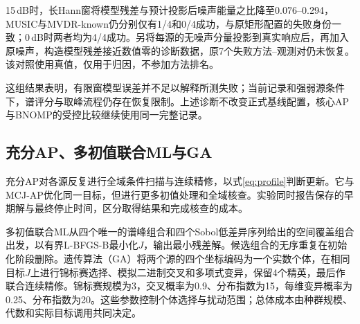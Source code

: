 \documentclass[a4paper]{cas-sc}
\numberwithin{equation}{section}
\numberwithin{figure}{section}
\numberwithin{table}{section}
\begin{document}
15\,dB时，长Hann窗将模型残差与预计投影后噪声能量之比降至0.076--0.294，MUSIC与MVDR-known仍分别仅有1/4和0/4成功，与原矩形配置的失败身份一致；0\,dB时两者均为4/4成功。另将每源的无噪声分量投影到真实响应后，再加入原噪声，构造模型残差接近数值零的诊断数据，原7个失败方法--观测对仍未恢复。该对照使用真值，仅用于归因，不参加方法排名。

这组结果表明，有限窗模型误差并不足以解释所测失败；当前记录和强弱源条件下，谱评分与取峰流程仍存在恢复限制。上述诊断不改变正式基线配置，核心AP与BNOMP的受控比较继续使用同一完整记录。

\subsection{充分AP、多初值联合ML与GA}
充分AP对各源反复进行全域条件扫描与连续精修，以式\eqref{eq:profile}判断更新\cite{ChenHudsonYao2002}。它与MCJ-AP优化同一目标，但进行更多初值处理和全域核查。实验同时报告保存的早期解与最终停止时间，区分取得结果和完成核查的成本。

多初值联合ML从四个唯一的谱峰组合和四个Sobol低差异序列给出的空间覆盖组合出发，以有界L-BFGS-B最小化$J$，输出最小残差解。候选组合的无序重复在初始化阶段删除。遗传算法（GA）将两个源的四个坐标编码为一个实数个体，在相同目标$J$上进行锦标赛选择、模拟二进制交叉和多项式变异\cite{DebAgrawal1995}，保留4个精英，最后作联合连续精修。锦标赛规模为3，交叉概率为0.9、分布指数为15，每维变异概率为0.25、分布指数为20。这些参数控制个体选择与扰动范围；总体成本由种群规模、代数和实际目标调用共同决定。
\end{document}
